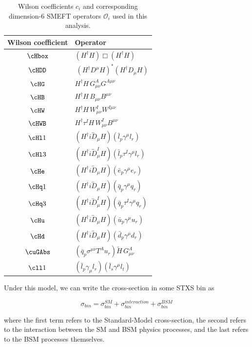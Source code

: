 \begin{table}
  \centering
  \begin{tabular}{c l}
  \toprule
  Wilson coefficient & Operator \\
  \hline
  $\cHbox$ & $(H^\dag H)\Box(H^\dag H)$\\
  $\cHDD$   & $\ \left(H^\dag D^\mu H\right)^* \left(H^\dag D_\mu H\right)$\\
  $\cHG$  & $H^\dag H\, G^A_{\mu\nu} G^{A\mu\nu}$  \\
  $\cHB$ &  $ H^\dag H\, B_{\mu\nu} B^{\mu\nu}$\\
  $\cHW$ &  $H^\dag H\, W^I_{\mu\nu} W^{I\mu\nu}$\\
  $\cHWB$ &  $ H^\dag \tau^I H\, W^I_{\mu\nu} B^{\mu\nu}$\\
  $\cHl1$ & $(H^\dag i\overleftrightarrow{D}_\mu H)(\bar l_p \gamma^\mu l_r)$\\
  $\cHl3$ & $(H^\dag i\overleftrightarrow{D}^I_\mu H)(\bar l_p \tau^I \gamma^\mu l_r)$\\
  $\cHe$  & $(H^\dag i\overleftrightarrow{D}_\mu H)(\bar e_p \gamma^\mu e_r)$\\
  $\cHq1$ & $(H^\dag i\overleftrightarrow{D}_\mu H)(\bar q_p \gamma^\mu q_r)$\\
  $\cHq3$ & $(H^\dag i\overleftrightarrow{D}^I_\mu H)(\bar q_p \tau^I \gamma^\mu q_r)$\\
  $\cHu$  & $(H^\dag i\overleftrightarrow{D}_\mu H)(\bar u_p \gamma^\mu u_r)$\\
  $\cHd$  & $(H^\dag i\overleftrightarrow{D}_\mu H)(\bar d_p \gamma^\mu d_r)$\\
  $\cuGAbs$ & $(\bar q_p \sigma^{\mu\nu} T^A u_r) \widetilde H \, G_{\mu\nu}^A$ \\
  $\cll1$   & $(\bar l_p \gamma_\mu l_r)(\bar l_s \gamma^\mu l_t)$ \\
  \bottomrule
\end{tabular}
  \caption{Wilson coefficients $c_i$ and corresponding dimension-6 SMEFT operators $\mathcal{O}_i$ used in this analysis.}
  \label{tab:EFT}
\end{table}

Under this model, we can write the cross-section in some STXS bin as 

\begin{equation}
\sigma_{bin} =  \sigma_{bin}^{SM} + \sigma_{bin}^{interaction} + \sigma_{bin}^{BSM}
\end{equation}

where the first term refers to the Standard-Model cross-section, the second refers to the interaction between the SM and BSM physics processes, and the last refers to the BSM processes themselves.

